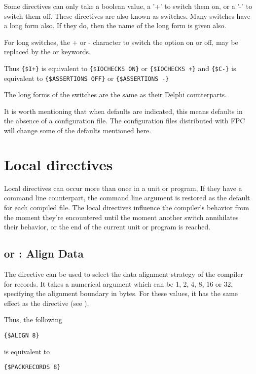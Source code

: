 Some directives can only take a boolean value, a '+' to switch them on,
or a '-' to switch them off. These directives are also known as switches.
Many switches have a long form also. If they do, then the name of the
long form is given also. 

For long switches, the + or - character to switch the option on or off, 
may be replaced by the  or  keywords.

Thus \verb|{$I+}| is equivalent to \verb|{$IOCHECKS ON}| or
\verb|{$IOCHECKS +}| and
\verb|{$C-}| is equivalent to \verb|{$ASSERTIONS OFF}| or
\verb|{$ASSERTIONS -}|

The long forms of the switches are the same as their Delphi
counterparts.

It is worth mentioning that when defaults are indicated, this means defaults
in the absence of a configuration file. The configuration files distributed
with FPC will change some of the defaults mentioned here.

\section{Local directives}
\label{se:LocalSwitch}
Local directives can occur more than once in a unit or program,
If they have a command line counterpart, the command line argument is
restored as the default for each compiled file. The local directives
influence the compiler's behavior from the moment they're encountered
until the moment another switch annihilates their behavior, or the end
of the current unit or program is reached.

\subsection{ or  : Align Data}
\label{se:Align}

The  directive can be used to select the data alignment 
strategy of the compiler for records. It takes a numerical argument
which can be 1, 2, 4, 8, 16 or 32, specifying the alignment boundary 
in bytes. For these values, it has the same effect as the 
 directive (see ).

Thus, the following
\begin{verbatim}
{$ALIGN 8}
\end{verbatim}
is equivalent to 
\begin{verbatim}
{$PACKRECORDS 8}
\end{verbatim}

